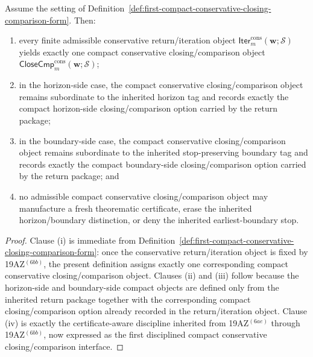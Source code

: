 \begin{proposition}
\label{prop:every-finite-admissible-conservative-return-iteration-object-yields-exactly-one-compact-conservative-closing-comparison-object}
Assume the setting of Definition~\ref{def:first-compact-conservative-closing-comparison-form}. Then:
\begin{enumerate}[label=(\roman*)]
  \item every finite admissible conservative return/iteration object \(\mathsf{Iter}^{\mathrm{cons}}_{m}(\mathbf w;\mathcal S)\) yields exactly one compact conservative closing/comparison object \(\mathsf{CloseCmp}^{\mathrm{cons}}_{m}(\mathbf w;\mathcal S)\);
  \item in the horizon-side case, the compact conservative closing/comparison object remains subordinate to the inherited horizon tag and records exactly the compact horizon-side closing/comparison option carried by the return package;
  \item in the boundary-side case, the compact conservative closing/comparison object remains subordinate to the inherited stop-preserving boundary tag and records exactly the compact boundary-side closing/comparison option carried by the return package; and
  \item no admissible compact conservative closing/comparison object may manufacture a fresh theorematic certificate, erase the inherited horizon/boundary distinction, or deny the inherited earliest-boundary stop.
\end{enumerate}
\end{proposition}

\begin{proof}
Clause (i) is immediate from Definition~\ref{def:first-compact-conservative-closing-comparison-form}: once the conservative return/iteration object is fixed by 19AZ$^{(6bb)}$, the present definition assigns exactly one corresponding compact conservative closing/comparison object. Clauses (ii) and (iii) follow because the horizon-side and boundary-side compact objects are defined only from the inherited return package together with the corresponding compact closing/comparison option already recorded in the return/iteration object. Clause (iv) is exactly the certificate-aware discipline inherited from 19AZ$^{(6ae)}$ through 19AZ$^{(6bb)}$, now expressed as the first disciplined compact conservative closing/comparison interface.
\end{proof}

